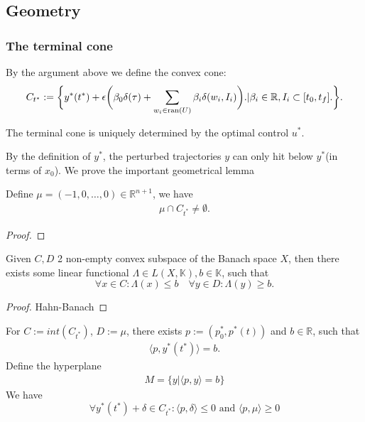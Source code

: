 \subsection{Geometry}                         
\subsubsection{The terminal cone}
By the argument above we define the convex cone:
\begin{equation}
	C_{t^*}:= \bigg\{y^*(t^*) + \epsilon\bigg( \beta_0 \delta(\tau)+ \sum_{w_i \in \operatorname{ran} (U)} \beta_i \delta(w_i, I_i) \bigg). | \beta_i \in \mathbb{R}, I_i \subset [t_0, t_f]. \bigg\}.
\end{equation}
\begin{remark}
The terminal cone is uniquely determined by the optimal control $u^*$. 	
\end{remark}


By the definition of $y^*$, the perturbed trajectories $y$ can only hit below $y^*$(in terms of $x_0$). We prove the important geometrical lemma
\begin{lemma}
	Define $\mu = (-1, 0, \dots, 0) \in \mathbb{R}^{n + 1}$, we have
	\begin{align*}
		\mu \cap C_{t^*} \neq \emptyset. 
	\end{align*}
\end{lemma}
\begin{proof}
\end{proof}




\begin{lemma}
	Given $C, D$ 2 non-empty convex subspace of the Banach space $X$, then there exists some linear functional $\Lambda \in L(X, \mathbb{K}), b \in \mathbb{K}$, such that 
	\begin{equation}
		\forall x \in C: \Lambda(x) \le b \quad \forall y \in D: \Lambda(y) \ge b. 
	\end{equation}
\end{lemma}
\begin{proof}
Hahn-Banach
\end{proof}

\begin{theorem}
	For $C:= int(C_{t^*})$, $D:= \mu$, there exists $p := (p^*_0, p^*(t))$ and $b \in \mathbb{R}$, such that 
	\begin{align*}
		\langle p, y^*(t^*) \rangle = b.
	\end{align*}
	Define the hyperplane
	\begin{align*}
		M = \{y | \langle p, y \rangle = b \}
	\end{align*}
	We have
	\begin{equation}
		\forall y^*(t^*) + \delta \in C_{t^*}: \langle p, \delta \rangle \le 0  \text{ and } \langle p, \mu \rangle \ge 0
	\end{equation}
\end{theorem}

